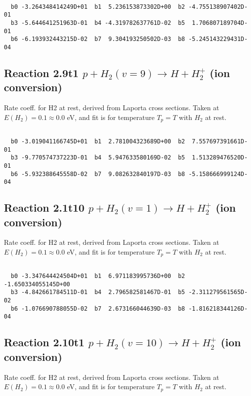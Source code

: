 \begin{small}\begin{verbatim}

  b0 -3.264348414249D+01  b1  5.236153873302D+00  b2 -4.755138907402D-01
  b3 -5.644641251963D-01  b4 -4.319782637761D-02  b5  1.706807189704D-01
  b6 -6.193932443215D-02  b7  9.304193250502D-03  b8 -5.245143229431D-04

\end{verbatim}\end{small}

\newpage
\subsection{
Reaction 2.9t1
$ p + H_2(v=9) \rightarrow H + H_2^+$ (ion conversion)
}
Rate coeff. for H2 at rest, derived from Laporta cross sections.
Taken at $E(H_2) = 0.1 \approx 0.0$ eV,  and fit is for temperature $T_p=T$ with $H_2$ at rest.

\begin{small}\begin{verbatim}

  b0 -3.019041166745D+01  b1  2.781004323689D+00  b2  7.557697391661D-01
  b3 -9.770574737223D-01  b4  5.947633580169D-02  b5  1.513289476520D-01
  b6 -5.932388645558D-02  b7  9.082632840197D-03  b8 -5.158666999124D-04

\end{verbatim}\end{small}

\newpage
\subsection{
Reaction 2.1t10
$ p + H_2(v=1) \rightarrow H + H_2^+$ (ion conversion)
}
Rate coeff. for H2 at rest, derived from Laporta cross sections.
Taken at $E(H_2) = 0.1 \approx 0.0$ eV,  and fit is for temperature $T_p=T$ with $H_2$ at rest.

\begin{small}\begin{verbatim}

  b0 -3.347644424504D+01  b1  6.971183995736D+00  b2 -1.650334055145D+00
  b3 -4.842661784511D-01  b4  2.796582581467D-01  b5 -2.311279561565D-02
  b6 -1.076690788055D-02  b7  2.673166044639D-03  b8 -1.816218344126D-04

\end{verbatim}\end{small}

\newpage
\subsection{
Reaction 2.10t1
$ p + H_2(v=10) \rightarrow H + H_2^+$ (ion conversion)
}
Rate coeff. for H2 at rest, derived from Laporta cross sections.
Taken at $E(H_2) = 0.1 \approx 0.0$ eV,  and fit is for temperature $T_p=T$ with $H_2$ at rest.

